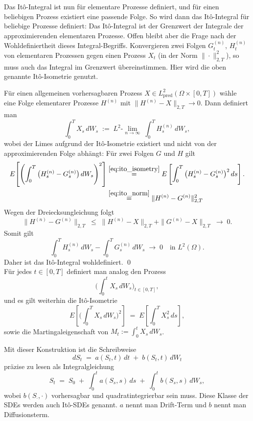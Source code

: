 \begin{defi}[It\^o-Integral]
Das It\^o-Integral ist nun für elementare Prozesse definiert, und für einen beliebigen Prozess existiert
eine passende Folge. So wird dann das It\^o-Integral für beliebige Prozesse definiert:
Das It\^o-Integral ist der Grenzwert der Integrale der approximierenden elementaren Prozesse.
Offen bleibt aber die Frage nach der Wohldefiniertheit dieses Integral-Begriffs. Konvergieren zwei Folgen $G_t^{(n)}$, $H_t^{(n)}$ von
elementaren Prozessen gegen einen Prozess $X_t$ (in der Norm $\|\cdot\|_{2,T}^2$), so muss auch das Integral im Grenzwert übereinstimmen.
Hier wird die oben genannte It\^o-Isometrie genutzt.

Für einen allgemeinen vorhersagbaren Prozess $X\in L^2_{\mathrm{pred}}(\Omega\times[0,T])$ wähle 
eine Folge elementarer Prozesse $H^{(n)}$ mit
$\|H^{(n)}-X\|_{2,T}\to 0$. Dann definiert man
$$
\int_0^T X_s\,dW_s \;:=\; L^2\text{-}\lim_{n\to\infty}\;\int_0^T H^{(n)}_s\,dW_s,
$$
wobei der Limes aufgrund der It\^o-Isometrie existiert und nicht von der approximierenden Folge abhängt:
Für zwei Folgen $G$ und $H$ gilt
$$
\begin{aligned}
E\!\left[
   \left( \int_0^T \big(H^{(n)}_s - G^{(n)}_s\big)\,dW_s \right)^2
\right]
&\overset{\ref{eq:ito_isometry}}{=}
E \left [ \int_0^T \big(H^{(n)}_s - G^{(n)}_s\big)^2\,ds \right ].
\\ &\overset{\ref{eq:ito_norm}}{=} \|H^{(n)} - G^{(n)}\|_{2,T}^2
\end{aligned}
$$
Wegen der Dreiecksungleichung folgt
$$
\|H^{(n)} - G^{(n)}\|_{2,T} 
\;\le\; 
\|H^{(n)} - X\|_{2,T} + \|G^{(n)} - X\|_{2,T}
\;\to\; 0.
$$
Somit gilt
$$
\int_0^T H^{(n)}_s\,dW_s - \int_0^T G^{(n)}_s\,dW_s 
\;\to\; 0 \quad \text{in } L^2(\Omega).
$$
Daher ist das It\^o-Integral wohldefiniert. \qed \\
Für jedes $t\in[0,T]$ definiert man analog den Prozess
$$
\Big(\int_0^t X_s\,dW_s\Big)_{t\in[0,T]},
$$
und es gilt weiterhin die It\^o-Isometrie
$$
E\!\left[\Big(\int_0^T X_s\,dW_s\Big)^{\!2}\right] \;=\; E\!\left[\int_0^T X_s^{2}\,ds\right],
$$
sowie die Martingaleigenschaft von $M_t:=\int_0^t X_s\,dW_s$.
\end{defi}

\begin{defi}
Mit dieser Konstruktion ist die Schreibweise
$$
dS_t \;=\; a(S_t,t)\,dt \;+\; b(S_t,t)\,dW_t
$$
präzise zu lesen als Integralgleichung
$$
S_t \;=\; S_0 \;+\; \int_0^t a(S_s,s)\,ds \;+\; \int_0^t b(S_s,s)\,dW_s,
$$
wobei $b(S_\cdot,\cdot)$ vorhersagbar und quadratintegrierbar sein muss. Diese Klasse der SDEs werden auch It\^o-SDEs genannt.
$a$ nennt man Drift-Term und $b$ nennt man Diffusionsterm.
\end{defi}

